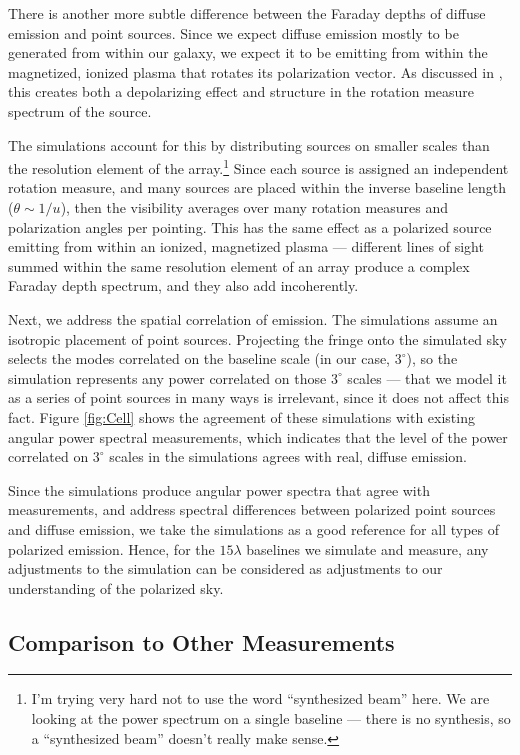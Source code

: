 There is another more subtle difference between the Faraday depths of diffuse emission and point
sources. Since we expect diffuse emission mostly to be generated from within our galaxy, we expect
it to be emitting from within the magnetized, ionized plasma that rotates its polarization vector.
As discussed in \citet{Jelic2010}, this creates both a depolarizing effect and structure in the
rotation measure spectrum of the source. 

The simulations account for this by distributing sources on smaller scales than the resolution
element of the array.\footnote{I'm trying very hard not to use the word ``synthesized beam'' here.
  We are looking at the power spectrum on a single baseline --- there is no synthesis, so a
``synthesized beam'' doesn't really make sense.} Since each source is assigned an independent
rotation measure, and many sources are placed within the inverse baseline length ($\theta \sim 1/u$),
then the visibility averages over many rotation measures and polarization angles per pointing. This
has the same effect as a polarized source emitting from within an ionized, magnetized plasma ---
different lines of sight summed within the same resolution element of an array produce a complex
Faraday depth spectrum, and they also add incoherently.

Next, we address the spatial correlation of emission. The simulations assume an isotropic placement
of point sources. Projecting the fringe onto the simulated sky selects the modes correlated on the
baseline scale (in our case, $3^\circ$), so the simulation represents any power correlated on those
$3^\circ$ scales --- that we model it as a series of point sources in many ways is irrelevant, since
it does not affect this fact. Figure \ref{fig:Cell} shows the agreement of these simulations with
existing angular power spectral measurements, which indicates that the level of the power correlated
on $3^\circ$ scales in the simulations agrees with real, diffuse emission. 

Since the simulations produce angular power spectra that agree with measurements, and address
spectral differences between polarized point sources and diffuse emission, we take the simulations
as a good reference for all types of polarized emission. Hence, for the $15\lambda$ baselines we
simulate and measure, any adjustments to the simulation can be considered as adjustments to our
understanding of the polarized sky. 

\subsection{Comparison to Other Measurements}

